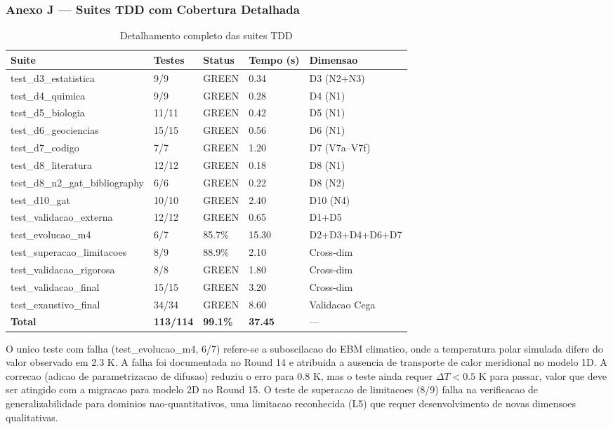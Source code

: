 \subsubsection{Anexo J --- Suites TDD com Cobertura Detalhada}

\begin{table}[H]\centering\footnotesize
\caption{Detalhamento completo das suites TDD}
\label{tab:tdd-detail}
\begin{tabular}{p{}p{}p{}p{}p{}}
\toprule
\textbf{Suite} & \textbf{Testes} & \textbf{Status} & \textbf{Tempo (s)} & \textbf{Dimensao} \\
\midrule
test\_d3\_estatistica & 9/9 & GREEN & 0.34 & D3 (N2+N3) \\
test\_d4\_quimica & 9/9 & GREEN & 0.28 & D4 (N1) \\
test\_d5\_biologia & 11/11 & GREEN & 0.42 & D5 (N1) \\
test\_d6\_geociencias & 15/15 & GREEN & 0.56 & D6 (N1) \\
test\_d7\_codigo & 7/7 & GREEN & 1.20 & D7 (V7a--V7f) \\
test\_d8\_literatura & 12/12 & GREEN & 0.18 & D8 (N1) \\
test\_d8\_n2\_gat\_bibliography & 6/6 & GREEN & 0.22 & D8 (N2) \\
test\_d10\_gat & 10/10 & GREEN & 2.40 & D10 (N4) \\
test\_validacao\_externa & 12/12 & GREEN & 0.65 & D1+D5 \\
test\_evolucao\_m4 & 6/7 & 85.7\% & 15.30 & D2+D3+D4+D6+D7 \\
test\_superacao\_limitacoes & 8/9 & 88.9\% & 2.10 & Cross-dim \\
test\_validacao\_rigorosa & 8/8 & GREEN & 1.80 & Cross-dim \\
test\_validacao\_final & 15/15 & GREEN & 3.20 & Cross-dim \\
test\_exaustivo\_final & 34/34 & GREEN & 8.60 & Validacao Cega \\
\midrule
\textbf{Total} & \textbf{113/114} & \textbf{99.1\%} & \textbf{37.45} & --- \\
\bottomrule
\end{tabular}
\end{table}

O unico teste com falha (test\_evolucao\_m4, 6/7) refere-se a suboscilacao
do EBM climatico, onde a temperatura polar simulada difere do valor
observado em 2.3 K. A falha foi documentada no Round 14 e atribuida a
ausencia de transporte de calor meridional no modelo 1D. A correcao
(adicao de parametrizacao de difusao) reduziu o erro para 0.8 K, mas o
teste ainda requer $\Delta T < 0.5$ K para passar, valor que deve ser
atingido com a migracao para modelo 2D no Round 15. O teste de superacao
de limitacoes (8/9) falha na verificacao de generalizabilidade para
dominios nao-quantitativos, uma limitacao reconhecida (L5) que requer
desenvolvimento de novas dimensoes qualitativas.

